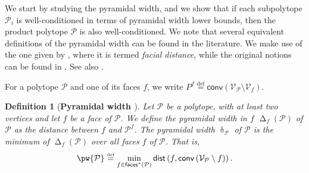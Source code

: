 \documentclass{article}
\newcommand\linktoproof[1]{{\normalfont[{\hyperlink{proof:#1}{$\downarrow$}}]}}
\newcommand{\mP}{\mathcal{P}}
\newcommand{\mQ}{\mathcal{Q}}
\newcommand{\verts}[1]{\mathcal{V}_{#1}}
\newcommand{\conv}[1]{\mathsf{conv}\left(#1\right)}
\newcommand{\faces}[1]{{\mathsf{faces}^\ast}\left(#1\right)}
\newcommand{\dist}[1]{\mathsf{dist}\left(#1\right)}
\newcommand{\defi}{\stackrel{\mathrm{\scriptscriptstyle def}}{=}}
\newtheorem{lemma}[theorem]{Lemma}
\newtheorem{definition}[theorem]{Definition}
\newif\ifTODO
\newcommand{\Dav}[1]{\ifTODO \todo[inline,author=DM, caption={}, color=yellow]{#1} \fi}
\newcommand{\eli}[1]{\ifTODO \todo[size=\scriptsize, color=magenta]{EW: #1}{} \fi}
\newcommand{\w}[1]{\operatorname{\delta}_{#1}}
\newcommand{\wface}[2]{\operatorname{\Delta}_{#1}(#2)}
\begin{document}
We start by studying the pyramidal width, and we show that if each subpolytope $\mP_i$ is well-conditioned in terms of pyramidal width lower bounds, then the product polytope $\mP$ is also well-conditioned.
We note that several equivalent definitions of the pyramidal width can be found in the literature. We make use of the one given by \citet{PR18},
where it is termed \emph{facial distance}, while the original notions can be found in \citep{lacoste2013affine}. See also \cite{BS15, LJ15}.
\eli{ if we rely on their characterization, i think we should call the objects we work with facial distances and not pyramidal width. we literally define things via the face. i strongly feel that we should make a final pass and change things to facial distance, it is the more descriptive term.

SOMEONE ELSE:
This change can be good and it's very easy to do. However, which term is more widely used? The CG book uses the pyramidal width term.

EW: Let's leave it then for now.
}


For a polytope $\mathcal{P}$ and one of its faces $f$, we write $P^f\defi\conv{\verts{\mP}\setminus \verts{f}}$.

\begin{definition}[\textbf{Pyramidal width \cite{PR18}}]\label{def:pyrwidth}
Let $\mP$ be a polytope, with at least two vertices and let $f$ be a face of $\mP$. We define the \emph{pyramidal width in $f$} $\wface{f}{\mP}$ of $\mP$ as the distance between $f$ and $\mP^f$. The \emph{pyramidal width} $\w{\mP}$ of $\mP$ is the minimum of $\wface{f}{\mP}$ over all faces $f$ of $\mP$. That is,
\begin{equation}\label{eq:pyrwidth_X}
\pw{\mP} \defi \min_{f \in \faces{\mP}} \dist{f, \conv{\verts{\mP} \setminus f}}.
    \vspace{0.3cm}
\end{equation}
\end{definition}
\end{document}
